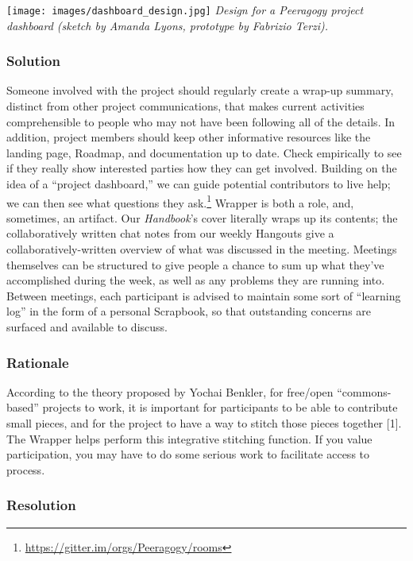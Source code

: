 \texttt{[image: images/dashboard\_design.jpg]} \emph{Design for a
Peeragogy project dashboard (sketch by Amanda Lyons, prototype by
Fabrizio Terzi).}

\hypertarget{solution}{%
\subsubsection{Solution}\label{solution}}

Someone involved with the project should regularly create a wrap-up
summary, distinct from other project communications, that makes current
activities comprehensible to people who may not have been following all
of the details. In addition, project members should keep other
informative resources like the landing page, {{Roadmap}}, and
documentation up to date. Check empirically to see if they really show
interested parties how they can get involved. Building on the idea of a
``project dashboard,'' we can guide potential contributors to live help;
we can then see what questions they ask.\footnote{\url{https://gitter.im/orgs/Peeragogy/rooms}}
{{Wrapper}} is both a role, and, sometimes, an artifact. Our
\emph{Handbook}'s cover literally wraps up its contents; the
collaboratively written chat notes from our weekly Hangouts give a
collaboratively-written overview of what was discussed in the meeting.
Meetings themselves can be structured to give people a chance to sum up
what they've accomplished during the week, as well as any problems they
are running into. Between meetings, each participant is advised to
maintain some sort of ``learning log'' in the form of a personal
{{Scrapbook}}, so that outstanding concerns are surfaced and available
to discuss.

\hypertarget{rationale}{%
\subsubsection{Rationale}\label{rationale}}

According to the theory proposed by Yochai Benkler, for free/open
``commons-based'' projects to work, it is important for participants to
be able to contribute small pieces, and for the project to have a way to
stitch those pieces together {{[}1{]}}. The {{Wrapper}} helps perform
this integrative stitching function. If you value participation, you may
have to do some serious work to facilitate access to process.

\hypertarget{resolution}{%
\subsubsection{Resolution}\label{resolution}}

